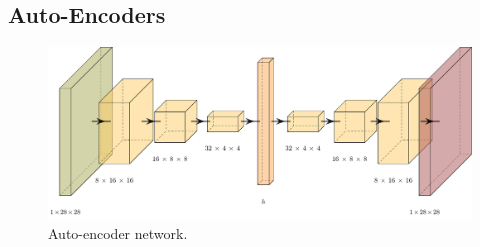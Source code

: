 \documentclass[11pt]{article}
\begin{document}
\subsection{Auto-Encoders}

\begin{figure}[p]
  \centering
  \includegraphics[width=1.5\columnwidth]{diagrams/auto.pdf}
  \caption{Auto-encoder network.}
  \label{fig:auto}
\end{figure}
\end{document}
